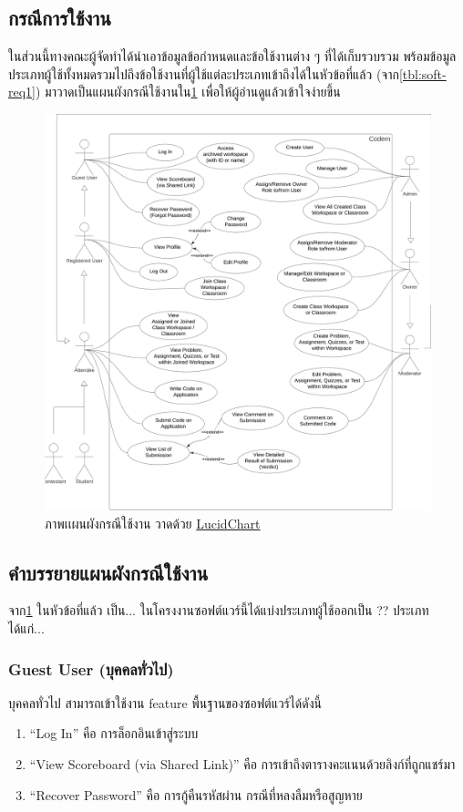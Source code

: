\documentclass[12pt,one side,openright,a4paper]{cpe-thesis-th}
\newcommand{\thaijustify}[1]{%
  \par\hspace{30pt}\justifying
  #1
}
\begin{document}
    \subsection{กรณีการใช้งาน}
        \thaijustify{
            ในส่วนนี้ทางคณะผู้จัดทำได้นำเอาข้อมูลข้อกำหนดและข้อใช้งานต่าง ๆ ที่ได้เก็บรวบรวม พร้อมข้อมูลประเภทผู้ใช้ทั้งหมดรวมไปถึงข้อใช้งานที่ผู้ใช้แต่ละประเภทเข้าถึงได้ในหัวข้อที่แล้ว  (จาก\cref{tbl:soft-req1}) มาวาดเป็นแผนผังกรณีใช้งานใน\cref{fig:usecase} เพื่อให้ผู้อ่านดูแล้วเข้าใจง่ายขึ้น
        } 
        \begin{figure}[!h]
        \centering
            \includegraphics[width=15cm]{figure/diagram/usecase-v5.png}
        \caption[ภาพเเผนผังกรณีใช้งาน]{ภาพเเผนผังกรณีใช้งาน วาดด้วย \href{https://lucid.app/}{LucidChart}}
        \label{fig:usecase}
        \end{figure}
        \pagebreak
    \subsection{คำบรรยายแผนผังกรณีใช้งาน}
        \thaijustify{
            จาก\cref{fig:usecase} ในหัวข้อที่แล้ว เป็น... ในโครงงานซอฟต์แวร์นี้ได้แบ่งประเภทผู้ใช้ออกเป็น ?? ประเภท ได้แก่...
        }
        \subsubsection{Guest User (บุคคลทั่วไป)}
            \thaijustify{
                บุคคลทั่วไป สามารถเข้าใช้งาน feature พื้นฐานของซอฟต์แวร์ได้ดังนี้
            }
            \begin{enumerate}
                \item “Log In” คือ การล็อกอินเข้าสู่ระบบ
                \item “View Scoreboard (via Shared Link)” คือ การเข้าถึงตารางคะแนนด้วยลิงก์ที่ถูกแชร์มา
                \item “Recover Password” คือ การกู้คืนรหัสผ่าน กรณีที่หลงลืมหรือสูญหาย
            \end{enumerate}
\end{document}
